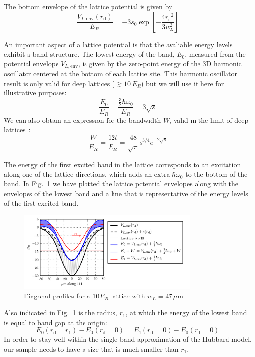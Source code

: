 \documentclass[11pt,letter]{article}
\newcommand{\rdiag}{\ensuremath{ r_{\text{d}} } }
\begin{document}
The bottom envelope of the lattice potential is given by 
\begin{equation}
  \frac{ V_{L,\text{env}}( \rdiag ) }{E_{R}} = -3 s_{0} 
  \exp \left[ - \frac{ 4 \rdiag^{2} }{3 w_{L}^{2} } \right]  
\end{equation} 


An important aspect of a lattice potential is that the avaliable energy levels
exhibit a band structure.  The lowest energy of the band, $E_{0}$, measured
from the potential envelope $V_{L,\text{env}}$, is given by the zero-point
energy of the 3D harmonic oscillator centered at the bottom of each lattice
site.   This harmonic oscillator result is only valid for deep lattices
($\gtrsim 10\,E_{R}$) but we will use it here for illustrative purposes: 
\begin{equation}
  \frac{E_{0}}{E_{R}} = 
     \frac{ \frac{3}{2} \hbar \omega_{0} }{ E_{R} } = 3\sqrt{ s } 
\end{equation} 
We can also obtain an expression for the bandwidth $W$, valid in the limit of
deep lattices~\cite{Bloch2008}:
\begin{equation}
  \frac{W}{E_{R}} =  
  \frac{12 t}{E_{R} }  = \frac{48}{\sqrt{\pi}} s^{3/4} e^{-2\sqrt{s}} 
\end{equation}

The energy of the first excited band in the lattice corresponds to an
excitation along one of the lattice directions, which adds an extra $\hbar
\omega_{0}$  to the bottom of the band.  In Fig.~\ref{fig:lattice_general} we
have plotted the lattice potential envelopes along with the envelopes of the
lowest band and a line that is representative of the energy levels of the first
excited band.  
\begin{figure}
    \centering
    \includegraphics[width=0.8\textwidth]{figures/lattice_general.png}
    \caption{Diagonal profiles for a 10$E_{R}$ lattice with $w_{L}=47\,\mu$m. }
\label{fig:lattice_general}
\end{figure}

Also indicated in Fig.~\ref{fig:lattice_general} is the radius, $r_{1}$, at
which the energy of the lowest band is equal to band gap at the origin:
\begin{equation}
  E_{0}(\rdiag = r_{1} ) -  E_{0}( \rdiag=0)  = 
  E_{1}(\rdiag = 0 ) -  E_{0}(\rdiag=0) 
\end{equation} 
 In order to stay well within the single band approximation of the Hubbard
model, our sample needs to have a size that is much smaller than $r_{1}$. 
\end{document}
